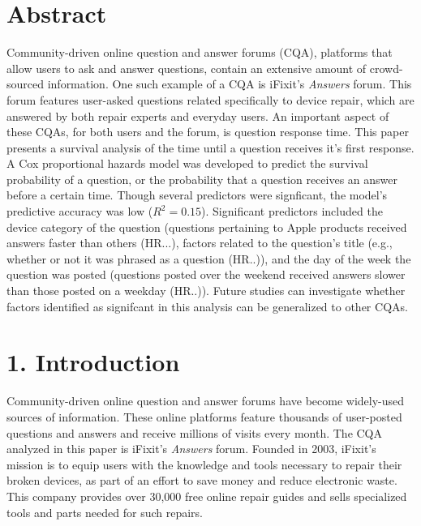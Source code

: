 \documentclass{article}
\begin{document}


\makeatletter
\DeclareRobustCommand\bfseries{%
  \not@math@alphabet\bfseries\mathbf
  \fontseries\bfdefault\selectfont
  \boldmath %
}
\makeatother





\section*{Abstract} %

Community-driven online question and answer forums (CQA), platforms that allow users to ask and answer questions, contain an extensive amount of crowd-sourced information. One such example of a CQA is iFixit's \textit{Answers} forum. This forum features user-asked questions related specifically to device repair, which are answered by both repair experts and everyday users. An important aspect of these CQAs, for both users and the forum, is question response time. This paper presents a survival analysis of the time until a question receives it's first response. A Cox proportional hazards model was developed to predict the survival probability of a question, or the probability that a question receives an answer before a certain time. Though several predictors were signficant, the model's predictive accuracy was low ($R^2 = 0.15$). Significant predictors included the device category of the question (questions pertaining to Apple products received answers faster than others (HR...), factors related to the question's title (e.g., whether or not it was phrased as a question (HR..)), and the day of the week the question was posted (questions posted over the weekend received answers slower than those posted on a weekday (HR..)). Future studies can investigate whether factors identified as signifcant in this analysis can be generalized to other CQAs. 


\section*{1. Introduction}

Community-driven online question and answer forums have become widely-used sources of information. These online platforms feature thousands of user-posted questions and answers and receive millions of visits every month. The CQA analyzed in this paper is iFixit's \textit{Answers} forum. Founded in 2003, iFixit's mission is to equip users with the knowledge and tools necessary to repair their broken devices, as part of an effort to save money and reduce electronic waste. This company provides over 30,000 free online repair guides and sells specialized tools and parts needed for such repairs.
    
\end{document}
